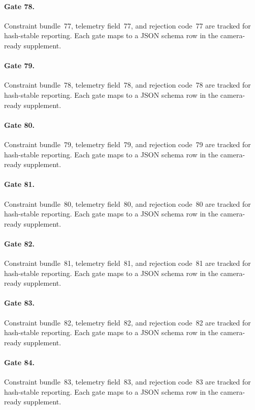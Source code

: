 \documentclass[sigconf,nonacm]{acmart}
\begin{document}
\paragraph{Gate 78.}
Constraint bundle~77, telemetry field~77, and rejection code~77 are tracked for hash-stable reporting. Each gate maps to a JSON schema row in the camera-ready supplement. %

\paragraph{Gate 79.}
Constraint bundle~78, telemetry field~78, and rejection code~78 are tracked for hash-stable reporting. Each gate maps to a JSON schema row in the camera-ready supplement. %

\paragraph{Gate 80.}
Constraint bundle~79, telemetry field~79, and rejection code~79 are tracked for hash-stable reporting. Each gate maps to a JSON schema row in the camera-ready supplement. %

\paragraph{Gate 81.}
Constraint bundle~80, telemetry field~80, and rejection code~80 are tracked for hash-stable reporting. Each gate maps to a JSON schema row in the camera-ready supplement. %

\paragraph{Gate 82.}
Constraint bundle~81, telemetry field~81, and rejection code~81 are tracked for hash-stable reporting. Each gate maps to a JSON schema row in the camera-ready supplement. %

\paragraph{Gate 83.}
Constraint bundle~82, telemetry field~82, and rejection code~82 are tracked for hash-stable reporting. Each gate maps to a JSON schema row in the camera-ready supplement. %

\paragraph{Gate 84.}
Constraint bundle~83, telemetry field~83, and rejection code~83 are tracked for hash-stable reporting. Each gate maps to a JSON schema row in the camera-ready supplement. %
\end{document}
